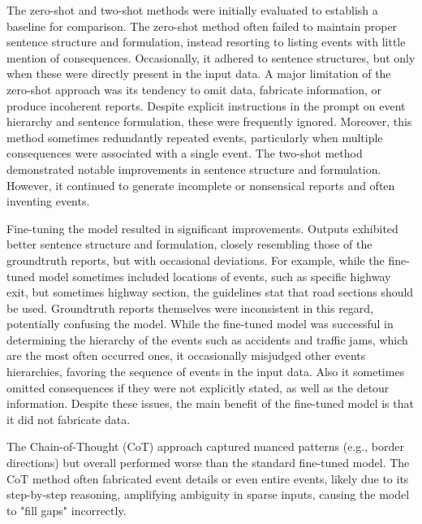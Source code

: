 \documentclass[fleqn,moreauthors,10pt]{ds_report}
\begin{document}
The zero-shot and two-shot methods were initially evaluated to establish a baseline for comparison. The zero-shot method often failed to maintain proper sentence structure and formulation, instead resorting to listing events with little mention of consequences. Occasionally, it adhered to sentence structures, but only when these were directly present in the input data. A major limitation of the zero-shot approach was its tendency to omit data, fabricate information, or produce incoherent reports. Despite explicit instructions in the prompt on event hierarchy and sentence formulation, these were frequently ignored. Moreover, this method sometimes redundantly repeated events, particularly when multiple consequences were associated with a single event. The two-shot method demonstrated notable improvements in sentence structure and formulation. However, it continued to generate incomplete or nonsensical reports and often inventing events. 

Fine-tuning the model resulted in significant improvements. Outputs exhibited better sentence structure and formulation, closely resembling those of the groundtruth reports, but with occasional deviations. For example, while the fine-tuned model sometimes included locations of events, such as specific highway exit, but sometimes highway section, the guidelines stat that road sections should be used. Groundtruth reports themselves were inconsistent in this regard, potentially confusing the model. While the fine-tuned model was successful in determining the hierarchy of the events such as accidents and traffic jams, which are the most often occurred ones, it occasionally misjudged other events hierarchies, favoring the sequence of events in the input data. Also it sometimes omitted consequences if they were not explicitly stated, as well as the detour information. Despite these issues, the main benefit of the fine-tuned model is that it did not fabricate data.

The Chain-of-Thought (CoT) approach captured nuanced patterns (e.g., border directions) but overall performed worse than the standard fine-tuned model.
The CoT method often fabricated event details or even entire events, likely due to its step-by-step reasoning, amplifying ambiguity in sparse inputs, causing the model to "fill gaps" incorrectly. 
\end{document}
